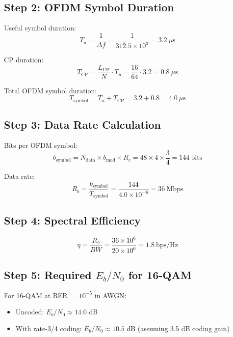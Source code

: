 \subsection*{Step 2: OFDM Symbol Duration}

Useful symbol duration:
\begin{equation}
T_u = \frac{1}{\Delta f} = \frac{1}{312.5 \times 10^3} = 3.2\ \mu\text{s}
\end{equation}

CP duration:
\begin{equation}
T_{\mathrm{CP}} = \frac{L_{\mathrm{CP}}}{N} \cdot T_u = \frac{16}{64} \cdot 3.2 = 0.8\ \mu\text{s}
\end{equation}

Total OFDM symbol duration:
\begin{equation}
T_{\mathrm{symbol}} = T_u + T_{\mathrm{CP}} = 3.2 + 0.8 = 4.0\ \mu\text{s}
\end{equation}

\subsection*{Step 3: Data Rate Calculation}

Bits per OFDM symbol:
\begin{equation}
b_{\mathrm{symbol}} = N_{\mathrm{data}} \times b_{\mathrm{mod}} \times R_c = 48 \times 4 \times \frac{3}{4} = 144\ \text{bits}
\end{equation}

Data rate:
\begin{equation}
R_b = \frac{b_{\mathrm{symbol}}}{T_{\mathrm{symbol}}} = \frac{144}{4.0 \times 10^{-6}} = 36\ \text{Mbps}
\end{equation}

\subsection*{Step 4: Spectral Efficiency}

\begin{equation}
\eta = \frac{R_b}{BW} = \frac{36 \times 10^6}{20 \times 10^6} = 1.8\ \text{bps/Hz}
\end{equation}

\subsection*{Step 5: Required $E_b/N_0$ for 16-QAM}

For 16-QAM at BER $= 10^{-5}$ in AWGN:
\begin{itemize}
\item Uncoded: $E_b/N_0 \approx 14.0$ dB
\item With rate-3/4 coding: $E_b/N_0 \approx 10.5$ dB (assuming 3.5 dB coding gain)
\end{itemize}

